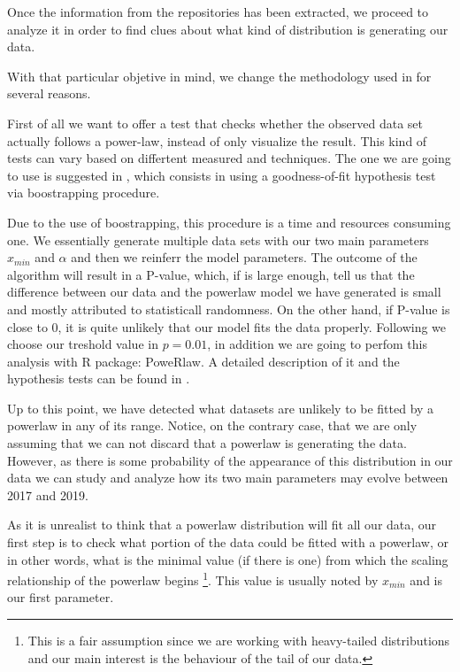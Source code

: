 \documentclass[conference]{IEEEtran}
\begin{document}
Once the information from the repositories has been extracted, we
proceed to analyze it in order to find clues about what kind of distribution is generating our data. 

With that particular objetive in mind, we change the methodology used
in \cite{merelo2017self} for several reasons.

First of all we want to offer a test that checks whether the observed data 
set actually follows a power-law, instead of only visualize the result. 
This kind of tests can vary based on differtent measured and techniques. The one we
are going to use is suggested in \cite{clauset2009power}, which consists in using a
goodness-of-fit hypothesis test via boostrapping procedure. 

Due to the use of boostrapping, this procedure is a time and resources consuming one.
We essentially  generate  multiple  data  sets  with our two main parameters $x_{min}$ 
and $\alpha$  and  then  we reinferr the model parameters. The outcome of the algorithm 
will result in a P-value, which, if is large enough, tell us that the difference
between our data and the powerlaw model we have generated is small and mostly attributed
to statisticall randomness. On the other hand, if P-value is close to 0, it is quite unlikely
that our model fits the data properly.
Following \cite{clauset2009power} we choose our treshold value in $p=0.01$, in addition
we are going to perfom this analysis with R package: PoweRlaw. A detailed description
of it and the hypothesis tests can be found in \cite{gillespie2015power}.

Up to this point, we have detected what datasets are unlikely to be fitted by a powerlaw
in any of its range. Notice, on the contrary case, that we are only assuming that
we can not discard that a powerlaw is generating the data.
However, as there is some probability of the appearance of this distribution in our data
we can study and analyze how its two main parameters may evolve between 2017 and 2019.

As it is unrealist to think that a powerlaw distribution will
fit all our data, our first step is to check what portion of the data
could be fitted with a powerlaw, or in other words, what is the minimal value 
(if there is one) from which the scaling relationship of the powerlaw begins
\footnote{This is a fair assumption since we are working with heavy-tailed distributions 
	and our main interest is the behaviour of the tail of our data.}. 
This value is usually noted by $x_{min}$ and is our first parameter.
\end{document}
